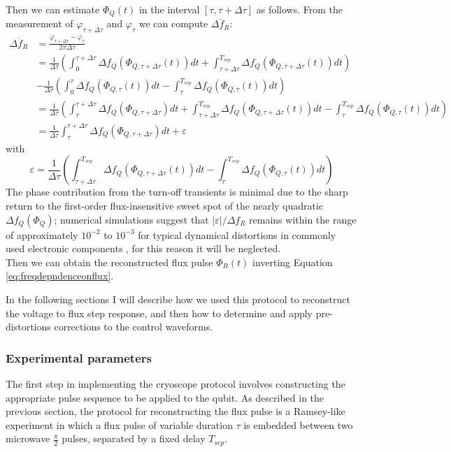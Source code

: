 Then we can estimate $\Phi_Q(t)$ in the interval $[\tau,\tau+\Delta\tau]$ as follows. From the measurement of $\varphi_{\tau + \Delta\tau}$ and $\varphi_\tau$ we can compute $\overline{\Delta f_R}$:
\begin{align}\label{eq:detuning}
    \overline{\Delta f_R} &= \frac{\varphi_{\tau+\Delta\tau} - \varphi_\tau}{2\pi\Delta\tau}\\ 
    &= \frac{1}{\Delta\tau}\left(\int_{0}^{\tau+\Delta\tau}\Delta f_Q (\Phi_{Q,\tau+\Delta\tau}(t))dt + \int_{\tau+\Delta\tau}^{T_{sep}}\Delta f_Q (\Phi_{Q,\tau+\Delta\tau}(t))dt\right) \\
    &-\frac{1}{\Delta\tau}\left(\int_{0}^{\tau}\Delta f_Q (\Phi_{Q,\tau}(t))dt - \int_{\tau}^{T_{sep}}\Delta f_Q (\Phi_{Q,\tau}(t))dt\right)\\
    &=\frac{1}{\Delta\tau}\left(\int_{\tau}^{\tau+\Delta\tau} \Delta f_Q(\Phi_{Q,\tau+\Delta\tau})dt + \int_{\tau+\Delta\tau}^{T_{sep}}\Delta f_Q (\Phi_{Q,\tau+\Delta\tau}(t))dt - \int_{\tau}^{T_{sep}}\Delta f_Q (\Phi_{Q,\tau}(t))dt\right)\\
    &= \frac{1}{\Delta\tau}\int_{\tau}^{\tau+\Delta\tau} \Delta f_Q(\Phi_{Q,\tau+\Delta\tau})dt + \varepsilon
\end{align}  
with \[\varepsilon = \frac{1}{\Delta\tau}\left(\int_{\tau+\Delta\tau}^{T_{sep}}\Delta f_Q (\Phi_{Q,\tau+\Delta\tau}(t))dt - \int_{\tau}^{T_{sep}}\Delta f_Q (\Phi_{Q,\tau}(t))dt\right)\]
The phase contribution from the turn-off transients is minimal due to the sharp return to the first-order flux-insensitive sweet spot of the nearly quadratic $\Delta f_Q(\Phi_Q)$; 
numerical simulations suggest that $|\varepsilon|/\Delta f_R$ remains within the range of approximately $10^{-2}$ to $10^{-3}$ for typical dynamical distortions in commonly used electronic components \cite{negligible} \cite{Langford2017}, for this reason it will be neglected.\\

Then we can obtain the reconstructed flux pulse $\Phi_R(t)$ inverting Equation \ref{eq:freqdepndenceonflux}.

In the following sections I will describe how we used this protocol to reconstruct the voltage to flux step response, and then how to determine and apply pre-distortions corrections to the control waveforms.

\subsubsection{Experimental parameters}
The first step in implementing the cryoscope protocol involves constructing the appropriate pulse sequence to be applied to the qubit. 
As described in the previous section, the protocol for reconstructing the flux pulse is a Ramsey-like experiment in which a flux pulse of variable duration $\tau$ is embedded between two microwave $\frac{\pi}{2}$ pulses, separated by a fixed delay $T_{sep}$.

